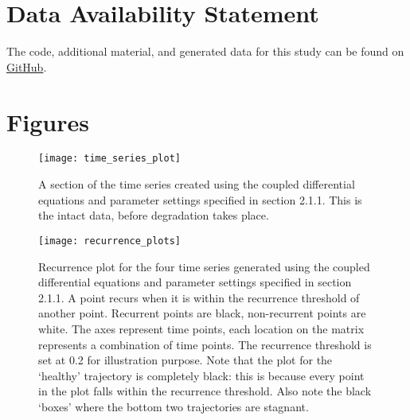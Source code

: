 \documentclass[utf8]{FrontiersinVancouver}
\begin{document}
\section*{Data Availability Statement}
The code, additional material, and generated data for this study can be found on \href{https://github.com/MvanSteenbergen/MasterThesisRQA}{GitHub}.


\newpage

\newpage
\section*{Figures}
\begin{figure}[H]
    \begin{center}
    \texttt{[image: time\_series\_plot]}
    \end{center}
    \caption{A section of the time series created using the coupled differential equations and parameter settings specified in section 2.1.1. This is the intact data, before degradation takes place.}\label{fig:1}
    \end{figure}

\newpage
\begin{figure}[H]
    \begin{center}
    \texttt{[image: recurrence\_plots]}
    \end{center}
    \caption{Recurrence plot for the four time series generated using the coupled differential equations and parameter settings specified in section 2.1.1. A point recurs when it is within the recurrence threshold of another point. Recurrent points are black, non-recurrent points are white. The axes represent time points, each location on the matrix represents a combination of time points. The recurrence threshold is set at 0.2 for illustration purpose. Note that the plot for the `healthy' trajectory is completely black: this is because every point in the plot falls within the recurrence threshold. Also note the black `boxes' where the bottom two trajectories are stagnant.}\label{fig:2}
    \end{figure}
\end{document}
